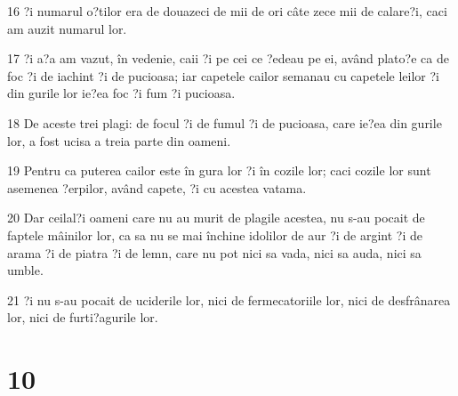 \par 16 ?i numarul o?tilor era de douazeci de mii de ori câte zece mii de calare?i, caci am auzit numarul lor.
\par 17 ?i a?a am vazut, în vedenie, caii ?i pe cei ce ?edeau pe ei, având plato?e ca de foc ?i de iachint ?i de pucioasa; iar capetele cailor semanau cu capetele leilor ?i din gurile lor ie?ea foc ?i fum ?i pucioasa.
\par 18 De aceste trei plagi: de focul ?i de fumul ?i de pucioasa, care ie?ea din gurile lor, a fost ucisa a treia parte din oameni.
\par 19 Pentru ca puterea cailor este în gura lor ?i în cozile lor; caci cozile lor sunt asemenea ?erpilor, având capete, ?i cu acestea vatama.
\par 20 Dar ceilal?i oameni care nu au murit de plagile acestea, nu s-au pocait de faptele mâinilor lor, ca sa nu se mai închine idolilor de aur ?i de argint ?i de arama ?i de piatra ?i de lemn, care nu pot nici sa vada, nici sa auda, nici sa umble.
\par 21 ?i nu s-au pocait de uciderile lor, nici de fermecatoriile lor, nici de desfrânarea lor, nici de furti?agurile lor.

\chapter{10}

